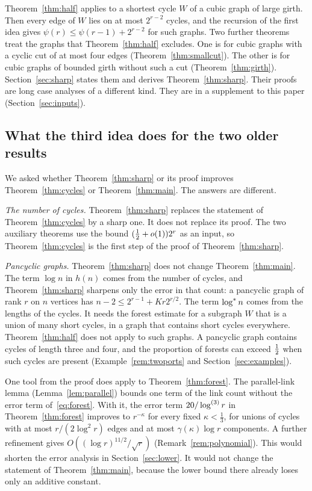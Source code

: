 Theorem~\ref{thm:half} applies to a shortest cycle $W$ of a cubic graph of large girth. Then every
edge of $W$ lies on at most $2^{r-2}$ cycles, and the recursion of the first idea gives
$\psi(r)\le\psi(r-1)+2^{r-2}$ for such graphs. Two further theorems treat the graphs that
Theorem~\ref{thm:half} excludes. One is for cubic graphs with a cyclic cut of at most four edges
(Theorem~\ref{thm:smallcut}). The other is for cubic graphs of bounded girth without such a cut
(Theorem~\ref{thm:girth}). Section~\ref{sec:sharp} states them and derives Theorem~\ref{thm:sharp}.
Their proofs are long case analyses of a different kind. They are in a supplement to this paper
(Section~\ref{sec:inputs}).

\subsection{What the third idea does for the two older results}\label{sec:three}

We asked whether Theorem~\ref{thm:sharp} or its proof improves Theorem~\ref{thm:cycles} or
Theorem~\ref{thm:main}. The answers are different.

\emph{The number of cycles.} Theorem~\ref{thm:sharp} replaces the statement of
Theorem~\ref{thm:cycles} by a sharp one. It does not replace its proof. The two auxiliary theorems
use the bound $(\tfrac12+o(1))2^{r}$ as an input, so Theorem~\ref{thm:cycles} is the first step of the
proof of Theorem~\ref{thm:sharp}.

\emph{Pancyclic graphs.} Theorem~\ref{thm:sharp} does not change Theorem~\ref{thm:main}. The term
$\log n$ in $h(n)$ comes from the number of cycles, and Theorem~\ref{thm:sharp} sharpens only the
error in that count: a pancyclic graph of rank $r$ on $n$ vertices has
$n-2\le2^{r-1}+Kr2^{r/2}$. The term $\log^{*} n$ comes from the lengths of the cycles. It needs the
forest estimate for a subgraph $W$ that is a union of many short cycles, in a graph that contains
short cycles everywhere. Theorem~\ref{thm:half} does not apply to such graphs. A pancyclic graph
contains cycles of length three and four, and the proportion of forests can exceed $\tfrac12$ when
such cycles are present (Example~\ref{rem:twoports} and Section~\ref{sec:examples}).

One tool from the proof does apply to Theorem~\ref{thm:forest}. The parallel-link lemma
(Lemma~\ref{lem:parallel}) bounds one term of the link count without the error term
of~\eqref{eq:forest}. With it, the error term $20/\log^{(3)}r$ in Theorem~\ref{thm:forest} improves to
$r^{-\kappa}$ for every fixed $\kappa<\frac13$, for unions of cycles with at most
$r/(2\log^{2}r)$ edges and at most $\gamma(\kappa)\log r$ components. A further refinement gives
$O((\log r)^{11/2}/\sqrt r)$ (Remark~\ref{rem:polynomial}). This would shorten the error
analysis in Section~\ref{sec:lower}. It would not change the statement of
Theorem~\ref{thm:main}, because the lower bound there already loses only an additive constant.

